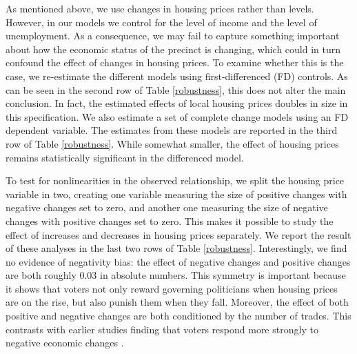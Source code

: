 \documentclass[12pt,a4paper]{article}
\begin{document}
	As mentioned above, we use changes in housing prices rather than levels. However, in our models we control for the level of income and the level of unemployment. As a consequence, we may fail to capture something important about how the economic status of the precinct is changing, which could in turn confound the effect of changes in housing prices. To examine whether this is the case, we re-estimate the different models using first-differenced (FD) controls. As can be seen in the second row of Table \ref{robustness}, this does not alter the main conclusion. In fact, the estimated effects of local housing prices doubles in size in this specification. We also estimate a set of complete change models using an FD dependent variable. The estimates from these models are reported in the third row of Table \ref{robustness}. While somewhat smaller, the effect of housing prices remains statistically significant in the differenced model.
	
	To test for nonlinearities in the observed relationship, we split the housing price variable in two, creating one variable measuring the size of positive changes with negative changes set to zero, and another one measuring the size of negative changes with positive changes set to zero. This makes it possible to study the effect of increases and decreases in housing prices separately. We report the result of these analyses in the last two rows of Table \ref{robustness}. Interestingly, we find no evidence of negativity bias: the effect of negative changes and positive changes are both roughly 0.03 in absolute numbers. This symmetry is important because it shows that voters not only reward governing politicians when housing prices are on the rise, but also punish them when they fall. Moreover, the effect of both positive and negative changes are both conditioned by the number of trades.  This contrasts with earlier studies finding that voters respond more strongly to negative economic changes \citep[e.g.][]{bloom1975voter,headrick1991attention,soroka2014negativity}. 
	
\end{document}
